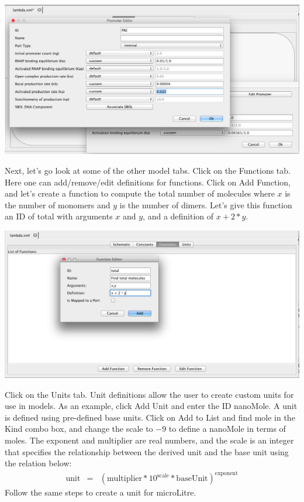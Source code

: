 \documentclass[titlepage,11pt]{article}
\begin{document}
\begin{center}
\includegraphics[width=160mm]{screenshots/activated_promoter}
\end{center}

Next, let's go look at some of the other model tabs.  Click on the Functions tab.  Here one can add/remove/edit definitions for functions.  Click on Add Function, and let's create a function to compute the total number of molecules where $x$ is the number of monomers and $y$ is the number of dimers.  Let's give this function an ID of total with arguments $x$ and $y$, and a definition of $x + 2 * y$.

\begin{center}
\includegraphics[width=160mm]{screenshots/function}
\end{center}

Click on the Units tab.  Unit definitions allow the user to create custom units for use in models.  As an example, click Add Unit and enter the ID nanoMole.  A unit is defined using pre-defined base units.  Click on Add to List and find mole in the Kind combo box, and change the scale to $-9$ to define a nanoMole in terms of moles. The exponent and multiplier are real numbers, and the scale is an integer that specifies the relationship between the derived unit and the base unit using the relation below:
\begin{eqnarray*}
\mathrm{unit} & = & (\mathrm{multiplier} * 10^\mathrm{scale} * \mathrm{baseUnit})^\mathrm{exponent}
\end{eqnarray*}
Follow the same steps to create a unit for microLitre.
\end{document}
